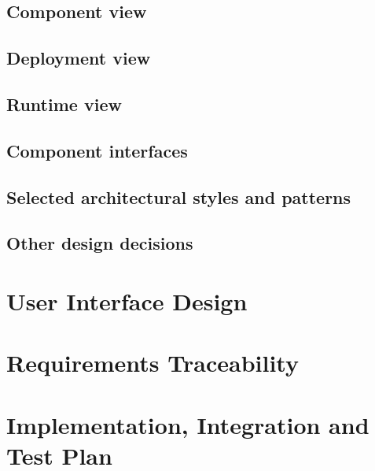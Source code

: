 \documentclass[10pt,openany]{book}
\begin{document}
		

	\section{Component view}

		

	\section{Deployment view}

		

	\section{Runtime view}

		

	\section{Component interfaces}

		

	\section{Selected architectural styles and patterns}

		

	\section{Other design decisions}

		

\chapter{User Interface Design}\label{chapt:sum}

\chapter{Requirements Traceability}\label{chapt:sum}

\chapter{Implementation, Integration and Test Plan}\label{chapt:sum}
\end{document}

